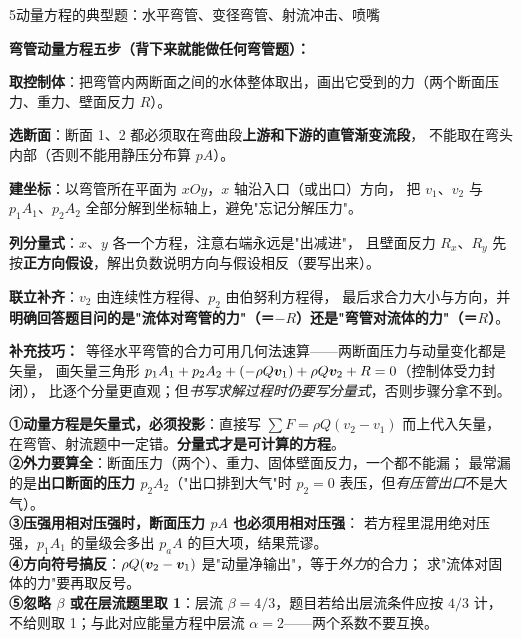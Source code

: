 \begin{kaodian}{5}{动量方程的典型题：水平弯管、变径弯管、射流冲击、喷嘴}
\begin{banfa}
\textbf{弯管动量方程五步（背下来就能做任何弯管题）：}
\begin{ti}
  \item \textbf{取控制体}：把弯管内两断面之间的水体整体取出，画出它受到的力（两个断面压力、重力、壁面反力 $R$）。
  \item \textbf{选断面}：断面 1、2 都必须取在弯曲段\textbf{上游和下游的直管渐变流段}，
        不能取在弯头内部（否则不能用静压分布算 $pA$）。
  \item \textbf{建坐标}：以弯管所在平面为 $xOy$，$x$ 轴沿入口（或出口）方向，
        把 $v_1$、$v_2$ 与 $p_1A_1$、$p_2A_2$ 全部分解到坐标轴上，避免"忘记分解压力"。
  \item \textbf{列分量式}：$x$、$y$ 各一个方程，注意右端永远是"出减进"，
        且壁面反力 $R_x$、$R_y$ 先按\textbf{正方向假设}，解出负数说明方向与假设相反（要写出来）。
  \item \textbf{联立补齐}：$v_2$ 由连续性方程得、$p_2$ 由伯努利方程得，
        最后求合力大小与方向，并\textbf{明确回答题目问的是"流体对弯管的力"（＝$-R$）还是"弯管对流体的力"（＝$R$）}。
\end{ti}
\textbf{补充技巧：}\ 等径水平弯管的合力可用几何法速算——两断面压力与动量变化都是矢量，
画矢量三角形 $p_1A_1+p_2A_2+(-\rho Q\bm{v}_1)+\rho Q\bm{v}_2+R=0$（控制体受力封闭），
比逐个分量更直观；但\emph{书写求解过程时仍要写分量式}，否则步骤分拿不到。
\end{banfa}

\begin{yicuo}
\textbf{①动量方程是矢量式，必须投影}：直接写 $\sum F=\rho Q(v_2-v_1)$ 而上代入矢量，
在弯管、射流题中一定错。\textbf{分量式才是可计算的方程}。\\
\textbf{②外力要算全}：断面压力（两个）、重力、固体壁面反力，一个都不能漏；
最常漏的是\textbf{出口断面的压力 $p_2A_2$}（"出口排到大气"时 $p_2=0$ 表压，但\emph{有压管出口}不是大气）。\\
\textbf{③压强用相对压强时，断面压力 $pA$ 也必须用相对压强}：
若方程里混用绝对压强，$p_1A_1$ 的量级会多出 $p_aA$ 的巨大项，结果荒谬。\\
\textbf{④方向符号搞反}：$\rho Q(\bm{v}_2-\bm{v}_1)$ 是"动量净输出"，等于\emph{外力}的合力；
求"流体对固体的力"要再取反号。\\
\textbf{⑤忽略 $\beta$ 或在层流题里取 1}：层流 \textbf{$\beta=4/3$}，题目若给出层流条件应按 $4/3$ 计，
不给则取 1；与此对应能量方程中层流 \textbf{$\alpha=2$}——两个系数不要互换。
\end{yicuo}
\end{kaodian}

